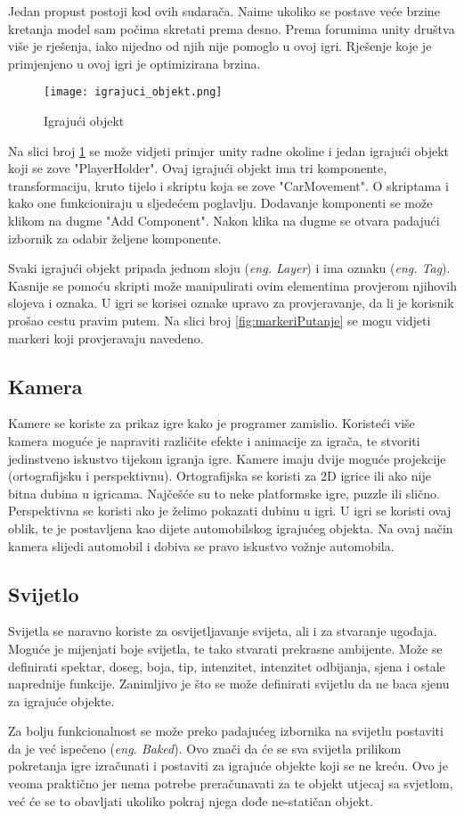 Jedan propust postoji kod ovih sudarača. Naime ukoliko se postave veće brzine kretanja model sam počima skretati prema desno. Prema forumima unity društva više je rješenja, iako nijedno od njih nije pomoglo u ovoj igri. Rješenje koje je primjenjeno u ovoj igri je optimizirana brzina.

\begin{figure}[h]
	\texttt{[image: igrajuci\_objekt.png]}
	\centering
	\caption{Igrajući objekt}
	\label{fig:igrajuciobjekt}
\end{figure}
\newpage
Na slici broj \ref{fig:igrajuciobjekt} se može vidjeti primjer unity radne okoline i jedan igrajući objekt koji se zove "PlayerHolder". Ovaj igrajući objekt ima tri komponente, transformaciju, kruto tijelo i skriptu koja se zove "CarMovement". O skriptama i kako one funkcioniraju u sljedećem poglavlju. Dodavanje komponenti se može klikom na dugme "Add Component". Nakon klika na dugme se otvara padajući izbornik za odabir željene komponente. \par
Svaki igrajući objekt pripada jednom sloju (\emph{eng. Layer}) i ima oznaku (\emph{eng. Tag}). Kasnije se pomoću skripti može manipulirati ovim elementima provjerom njihovih slojeva i oznaka. U igri se korisei oznake upravo za provjeravanje, da li je korisnik prošao cestu pravim putem. Na slici broj \ref{fig:markeriPutanje} se mogu vidjeti markeri koji provjeravaju navedeno.
\subsection{Kamera}
Kamere se koriste za prikaz igre kako je programer zamislio. Koristeći više kamera moguće je napraviti različite efekte i animacije za igrača, te stvoriti jedinstveno iskustvo tijekom igranja igre. Kamere imaju dvije moguće projekcije (ortografijsku i perspektivnu). Ortografijska se koristi za 2D igrice ili ako nije bitna dubina u igricama. Najčešće su to neke platformske igre, puzzle ili slično. Perspektivna se koristi ako je želimo pokazati dubinu u igri. U igri se koristi ovaj oblik, te je postavljena kao dijete automobilskog igrajućeg objekta. Na ovaj način kamera slijedi automobil i dobiva se pravo iskustvo vožnje automobila.
\subsection{Svijetlo}
Svijetla se naravno koriste za osvijetljavanje svijeta, ali i za stvaranje ugođaja. Moguće je mijenjati boje svijetla, te tako stvarati prekrasne ambijente. Može se definirati spektar, doseg, boja, tip, intenzitet, intenzitet odbijanja, sjena i ostale naprednije funkcije. Zanimljivo je što se može definirati svijetlu da ne baca sjenu za igrajuće objekte. \par
Za bolju funkcionalnost se može preko padajućeg izbornika na svijetlu postaviti da je već ispečeno (\emph{eng. Baked}). Ovo znači da će se sva svijetla prilikom pokretanja igre izračunati i postaviti za igrajuće objekte koji se ne kreću. Ovo je veoma praktično jer nema potrebe preračunavati za te objekt utjecaj sa svjetlom, već će se to obavljati ukoliko pokraj njega dođe ne-statičan objekt.
